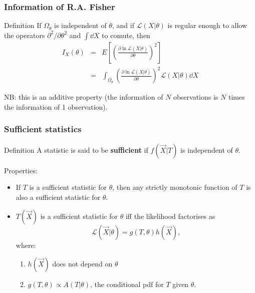 \documentclass[9pt]{beamer}
\begin{document}
\begin{frame}
 \frametitle{Information of R.A. Fisher}
 
 \begin{block}{Definition}
 If $\Omega_\theta$ is independent of $\theta$, and if $\mathcal{L}(X|\theta)$ is regular enough to allow the operators $\partial^2/\partial\theta^2$ and $\int \dd X$ to comute, then
  \begin{eqnarray}
   I_X(\theta) & = & E \left[ \left( \frac{\partial \ln \mathcal{L}(X|\theta)}{\partial \theta} \right)^2 \right] \nonumber \\
   & = & \int_{\Omega_\theta} \left( \frac{\partial \ln \mathcal{L}(X|\theta)}{\partial \theta} \right)^2 \mathcal{L}(X|\theta) \dd X
  \end{eqnarray}

 \end{block}
 
 NB: this is an additive property (the information of $N$ observations is $N$ times the information of 1 observation).

\end{frame}


\begin{frame}
 \frametitle{Sufficient statistics}
 
 \begin{block}{Definition}
  A statistic is said to be \textbf{sufficient} if $f(\vec{X}|T)$ is independent of $\theta$.
 \end{block}
 
 Properties:
 
 \begin{itemize}
  \item If $T$ is a sufficient statistic for $\theta$, then any strictly monotonic function of $T$ is also a sufficient statistic for $\theta$.
  \item $T(\vec{X})$ is a sufficient statistic for $\theta$ iff the likelihood factorises as
  $$\mathcal{L}(\vec{X}|\theta) = g(T,\theta) h(\vec{X}),$$
  where:
  \begin{enumerate}
   \item $h(\vec{X})$ does not depend on $\theta$
   \item $g(T,\theta) \propto A(T|\theta)$, the conditional pdf for $T$ given $\theta$.
  \end{enumerate}
 \end{itemize}


\end{frame}
\end{document}

